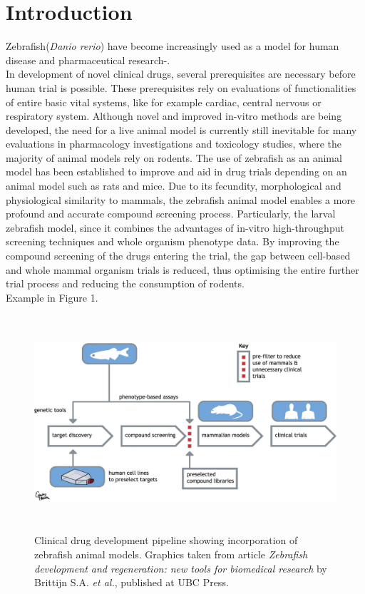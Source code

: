 \documentclass[a4paper,12pt]{article}
\begin{document}
\section{Introduction}
Zebrafish(\textit{Danio rerio}) have become increasingly used as a model for human disease and pharmaceutical research\cite{ref1}-\cite{ref3}. 
\\In development of novel
clinical drugs, several prerequisites are necessary before human trial is possible. These prerequisites rely on evaluations of functionalities of entire basic
vital systems, like for example cardiac, central nervous or respiratory system\cite{ref4}.
Although novel and improved in-vitro methods are being developed, the need for a live animal model is currently still inevitable for many evaluations in pharmacology investigations and toxicology studies, where the majority of animal models rely on rodents. The use of zebrafish as an animal model has been established to improve and aid in drug trials depending on an animal model such as rats and mice.
Due to its fecundity, morphological and physiological similarity to mammals, the zebrafish animal model enables a more profound and accurate compound screening process. 
Particularly, the larval zebrafish model, since it combines the advantages of in-vitro high-throughput screening techniques and whole organism phenotype data. By improving the compound screening of
the drugs entering the trial, the gap between cell-based and whole mammal organism trials is reduced, thus optimising the entire further trial process and reducing the consumption
of rodents\cite{ref1}. \\Example in Figure 1.
\begin{figure}[h]
\begin{center}
\includegraphics[width=16cm,height=8cm]{drug_trial_example.jpg}
\caption{Clinical drug development pipeline showing incorporation of zebrafish animal models. Graphics taken from article \textit{Zebrafish development and regeneration:
new tools for biomedical research} by Brittijn S.A. \textit{et al.}, published at  UBC Press\cite{ref1}. }
\end{center}
\end{figure}\\\\\\
\end{document}
